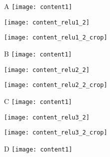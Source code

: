 \begin{figure}[h]
	\centering
    \begin{subfigure}[b]{0.3\textwidth}
    	A
		\centering
        \texttt{[image: content1]}
        \label{fig:content}
	\end{subfigure}
    \hfill
    \begin{subfigure}[b]{0.3\textwidth}
		\centering
        \texttt{[image: content\_relu1\_2]}
        \label{fig:content_relu1_2}
	\end{subfigure}
    \hfill
    \begin{subfigure}[b]{0.3\textwidth}
		\centering
        \texttt{[image: content\_relu1\_2\_crop]}
        \label{fig:content_relu1_2_crop}
	\end{subfigure}
    \begin{subfigure}[b]{0.3\textwidth}
    	B
		\centering
        \texttt{[image: content1]}
        \label{fig:content}
	\end{subfigure}
    \hfill
    \begin{subfigure}[b]{0.3\textwidth}
		\centering
        \texttt{[image: content\_relu2\_2]}
        \label{fig:content_relu2_2}
	\end{subfigure}
    \hfill
    \begin{subfigure}[b]{0.3\textwidth}
		\centering
        \texttt{[image: content\_relu2\_2\_crop]}
        \label{fig:content_relu2_2_crop}
	\end{subfigure}
    \begin{subfigure}[b]{0.3\textwidth}
    	C
		\centering
        \texttt{[image: content1]}
        \label{fig:content}
	\end{subfigure}
    \hfill
    \begin{subfigure}[b]{0.3\textwidth}
		\centering
        \texttt{[image: content\_relu3\_2]}
        \label{fig:content_relu3_2}
	\end{subfigure}
    \hfill
    \begin{subfigure}[b]{0.3\textwidth}
		\centering
        \texttt{[image: content\_relu3\_2\_crop]}
        \label{fig:content_relu3_2_crop}
	\end{subfigure}
    \begin{subfigure}[b]{0.3\textwidth}
    	D
		\centering
        \texttt{[image: content1]}

\end{subfigure}
\end{figure}
